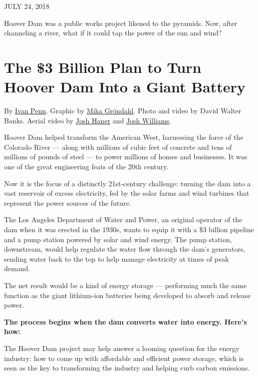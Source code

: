 JULY 24, 2018

Hoover Dam was a public works project likened to the pyramids. Now,
after channeling a river, what if it could tap the power of the sun and
wind?

\hypertarget{the-3-billion-plan-to-turn-hoover-dam-into-a-giant-battery-1}{%
\section{The \$3 Billion Plan to Turn Hoover Dam Into a Giant
Battery}\label{the-3-billion-plan-to-turn-hoover-dam-into-a-giant-battery-1}}

By \href{https://www.nytimes3xbfgragh.onion/by/ivan-penn}{Ivan Penn}.
Graphic by
\href{http://www.nytimes3xbfgragh.onion/by/mika-grondahl}{Mika
Gr}\href{http://www.nytimes3xbfgragh.onion/by/mika-grondahl}{ö}\href{http://www.nytimes3xbfgragh.onion/by/mika-grondahl}{ndahl}.
Photo and video by David Walter Banks. Aerial video by
\href{https://www.nytimes3xbfgragh.onion/by/josh-haner}{Josh Haner} and
\href{https://www.nytimes3xbfgragh.onion/by/josh-williams}{Josh
Williams}.

Hoover Dam helped transform the American West, harnessing the force of
the Colorado River --- along with millions of cubic feet of concrete and
tens of millions of pounds of steel --- to power millions of homes and
businesses. It was one of the great engineering feats of the 20th
century.

Now it is the focus of a distinctly 21st-century challenge: turning the
dam into a vast reservoir of excess electricity, fed by the solar farms
and wind turbines that represent the power sources of the future.

The Los Angeles Department of Water and Power, an original operator of
the dam when it was erected in the 1930s, wants to equip it with a \$3
billion pipeline and a pump station powered by solar and wind energy.
The pump station, downstream, would help regulate the water flow through
the dam's generators, sending water back to the top to help manage
electricity at times of peak demand.

The net result would be a kind of energy storage --- performing much the
same function as the giant lithium-ion batteries being developed to
absorb and release power.

\textbf{The process begins when the dam converts water into energy.
Here's how:}

The Hoover Dam project may help answer a looming question for the energy
industry: how to come up with affordable and efficient power storage,
which is seen as the key to transforming the industry and helping curb
carbon emissions.

